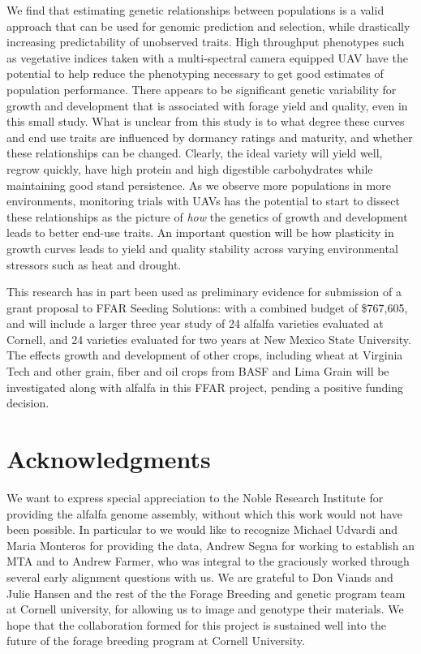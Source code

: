 \documentclass[12pt, letterpaper]{article}
\begin{document}
We find that estimating genetic relationships between populations is a valid approach that can be used for genomic prediction and selection, while drastically increasing predictability of unobserved traits. High throughput phenotypes such as vegetative indices taken with a multi-spectral camera equipped UAV have the potential to help reduce the phenotyping necessary to get good estimates of population performance. There appears to be significant genetic variability for growth and development that is associated with forage yield and quality, even in this small study. What is unclear from this study is to what degree these curves and end use traits are influenced by dormancy ratings and maturity, and whether these relationships can be changed. Clearly, the ideal variety will yield well, regrow quickly, have high protein and high digestible carbohydrates while maintaining good stand persistence. As we observe more populations in more environments, monitoring trials with UAVs has the potential to start to dissect these relationships as the picture of \emph{how} the genetics of growth and development leads to better end-use traits. An important question will be how plasticity in growth curves leads to yield and quality stability across varying environmental stressors such as heat and drought. 

This research has in part been used as preliminary evidence for submission of a grant proposal to FFAR Seeding Solutions: with a combined budget of \$767,605, and will include a larger three year study of 24 alfalfa varieties evaluated at Cornell, and 24 varieties evaluated for two years at New Mexico State University. The effects growth and development of other crops, including wheat at Virginia Tech and other grain, fiber and oil crops from BASF and Lima Grain will be investigated along with alfalfa in this FFAR project, pending a positive funding decision. 

\clearpage

\section{Acknowledgments}

We want to express special appreciation to the Noble Research Institute for providing the alfalfa genome assembly, without which this work would not have been possible. In particular to we would like to recognize Michael Udvardi and Maria Monteros for providing the data, Andrew Segna for working to establish an MTA and to Andrew Farmer, who was integral to the graciously worked through several early alignment questions with us.  We are grateful to Don Viands and Julie Hansen and the rest of the  the Forage Breeding and genetic program team at Cornell university, for allowing us to image and genotype their materials. We hope that the collaboration formed for this project is sustained well into the future of the forage breeding program at Cornell University. %
\end{document}
